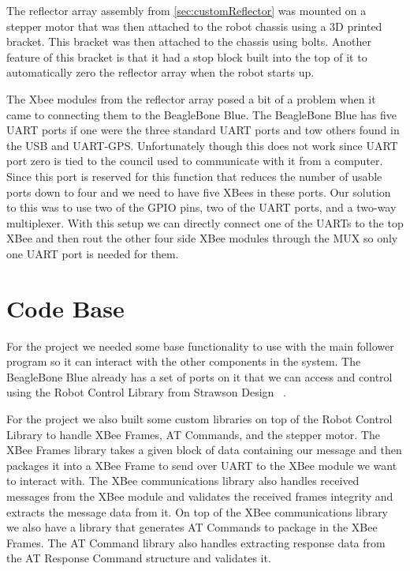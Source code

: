 \vspace*{12pt}
\noindent
The reflector array assembly from \autoref{sec:customReflector} was mounted on a stepper motor that was then attached to the robot chassis using a 3D printed bracket. This bracket was then attached to the chassis using bolts. Another feature of this bracket is that it had a stop block built into the top of it to automatically zero the reflector array when the robot starts up.

\vspace*{12pt}
\noindent
The Xbee modules from the reflector array posed a bit of a problem when it came to connecting them to the BeagleBone Blue. The BeagleBone Blue has five UART ports if one were the three standard UART ports and tow others found in the USB and UART-GPS. Unfortunately though this does not work since UART port zero is tied to the council used to communicate with it from a computer. Since this port is reserved for this function that reduces the number of usable ports down to four and we need to have five XBees in these ports. Our solution to this was to use two of the GPIO pins, two of the UART ports, and a two-way multiplexer. With this setup we can directly connect one of the UARTs to the top XBee and then rout the other four side XBee modules through the MUX so only one UART port is needed for them.


\section{Code Base}
\label{sec:Code Base}

For the project we needed some base functionality to use with the main follower program so it can interact with the other components in the system. The BeagleBone Blue already has a set of ports on it that we can access and control using the Robot Control Library from Strawson Design ~\cite{Robot_Control_Library}.

\vspace*{12pt}
\noindent
For the project we also built some custom libraries on top of the Robot Control Library to handle XBee Frames, AT Commands, and the stepper motor. The XBee Frames library takes a given block of data containing our message and then packages it into a XBee Frame to send over UART to the XBee module we want to interact with. The XBee communications library also handles received messages from the XBee module and validates the received frames integrity and extracts the message data from it. On top of the XBee communications library we also have a library that generates AT Commands to package in the XBee Frames. The AT Command library also handles extracting response data from the AT Response Command structure and validates it.

